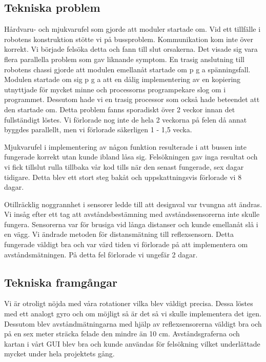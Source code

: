 \documentclass[a4paper,12pt,fleqn]{article}
\begin{document}
\subsection{Tekniska problem}

Hårdvaru- och mjukvarufel som gjorde att moduler startade om. 
Vid ett tillfälle i robotens konstruktion stötte vi på bussproblem. Kommunikation kom inte över korrekt. Vi började felsöka detta och fann till slut orsakerna. Det visade sig vara flera parallella problem som gav liknande symptom. En trasig anslutning till robotens chassi gjorde att modulen emellanåt startade om p g a spänningsfall. Modulen startade om sig p g a att en dålig implementering av en kopiering utnyttjade för mycket minne och processorns programpekare slog om i programmet. Dessutom hade vi en trasig processor som också hade beteendet att den startade om. Detta problem fanns sporadiskt över 2 veckor innan det fullständigt löstes. Vi förlorade nog inte de hela 2 veckorna på felen då annat byggdes parallellt, men vi förlorade säkerligen 1 - 1,5 vecka.

Mjukvarufel i implementering av någon funktion resulterade i att bussen inte fungerade korrekt utan kunde ibland låsa sig.
Felsökningen gav inga resultat och vi fick tillslut rulla tillbaka vår kod tills när den senast fungerade, sex dagar tidigare. Detta blev ett stort steg bakåt och uppskattningsvis förlorade vi 8 dagar.

Otillräcklig noggrannhet i sensorer ledde till att designval var tvungna att ändras.
Vi insåg efter ett tag att avståndsbestämning med avståndssensorerna inte skulle fungera. Sensorerna var för brusiga vid långa distanser och kunde emellanåt slå i en vägg. Vi ändrade metoden för distansmätning till reflexsensorn. Detta fungerade väldigt bra och var värd tiden vi förlorade på att implementera om avståndsmätningen. På detta fel förlorade vi ungefär 2 dagar.

\subsection{Tekniska framgångar}
Vi är otroligt nöjda med våra rotationer vilka blev väldigt precisa.
Dessa löstes med ett analogt gyro och om möjligt så är det så vi skulle implementera det igen. Dessutom blev avståndmätningarna med hjälp av reflexsensorerna väldigt bra och på en sex meter sträcka felade den mindre än 10 cm.
Avståndsgraferna och kartan i vårt GUI blev bra och kunde användas för felsökning vilket underlättade mycket under hela projektets gång.
\end{document}
